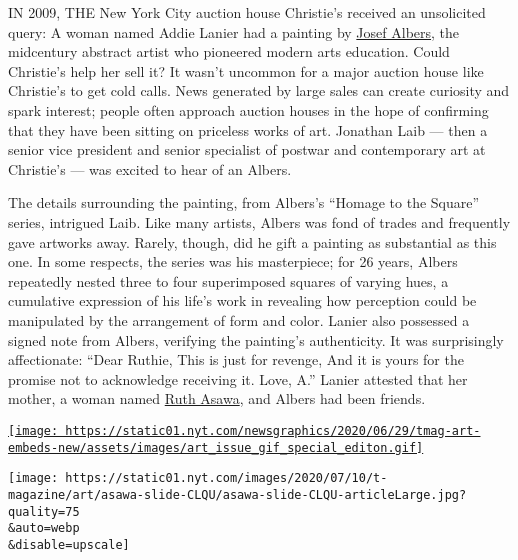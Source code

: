 IN 2009, THE New York City auction house Christie's received an
unsolicited query: A woman named Addie Lanier had a painting by
\href{https://www.nytimes.com/1976/03/26/archives/josef-albers-artist-and-teacher-dies.html}{Josef
Albers}, the midcentury abstract artist who pioneered modern arts
education. Could Christie's help her sell it? It wasn't uncommon for a
major auction house like Christie's to get cold calls. News generated by
large sales can create curiosity and spark interest; people often
approach auction houses in the hope of confirming that they have been
sitting on priceless works of art. Jonathan Laib --- then a senior vice
president and senior specialist of postwar and contemporary art at
Christie's --- was excited to hear of an Albers.

The details surrounding the painting, from Albers's ``Homage to the
Square'' series, intrigued Laib. Like many artists, Albers was fond of
trades and frequently gave artworks away. Rarely, though, did he gift a
painting as substantial as this one. In some respects, the series was
his masterpiece; for 26 years, Albers repeatedly nested three to four
superimposed squares of varying hues, a cumulative expression of his
life's work in revealing how perception could be manipulated by the
arrangement of form and color. Lanier also possessed a signed note from
Albers, verifying the painting's authenticity. It was surprisingly
affectionate: ``Dear Ruthie, This is just for revenge, And it is yours
for the promise not to acknowledge receiving it. Love, A.'' Lanier
attested that her mother, a woman named
\href{https://www.nytimes.com/news/the-lives-they-lived/2013/12/21/ruth-asawa/}{Ruth
Asawa}, and Albers had been friends.

\href{https://www.nytimes.com/issue/t-magazine/2020/07/02/true-believers-art-issue}{\texttt{[image: https://static01.nyt.com/newsgraphics/2020/06/29/tmag-art-embeds-new/assets/images/art\_issue\_gif\_special\_editon.gif]}}

\texttt{[image: https://static01.nyt.com/images/2020/07/10/t-magazine/art/asawa-slide-CLQU/asawa-slide-CLQU-articleLarge.jpg?quality=75\\\&auto=webp\\\&disable=upscale]}

